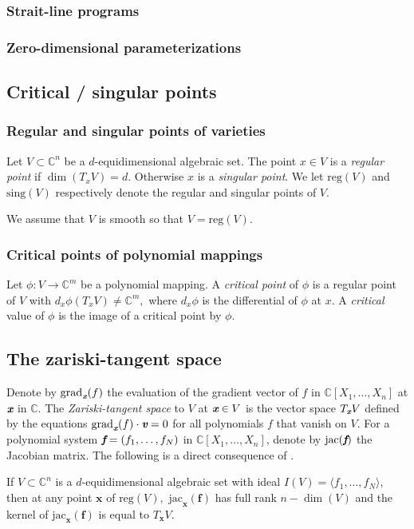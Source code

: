 \documentclass[sigconf]{acmart}
\def\xb{\textit{\textbf{x}}}
\def\C{\mathbb{C}}
\def\sing{ \textrm{sing}}
\def\jac{ \textrm{jac}}
\def\grad{\textrm{grad}}
\def\reg{\textrm{reg}}
\begin{document}
\subsubsection{Strait-line programs}
%
\subsubsection{Zero-dimensional parameterizations}
%
\subsection{Critical / singular points}
%
\subsubsection{Regular and singular points of varieties}
%
Let $V \subset \C^n$ be a $d$-equidimensional algebraic set. 
The point $x \in V$ is a \textit{regular point} if $\dim (T_xV) = d.$ Otherwise $x$ is a \textit{singular point}. We let $\reg(V)$ and $\sing(V)$ respectively denote the regular and singular points of $V$. 
\par 
We assume that $V$ is smooth so that $V=\reg(V).$
%
\subsubsection{Critical points of polynomial mappings}
%
Let $\phi : V \rightarrow \C^m$ be a polynomial mapping. A \textit{critical point} of $\phi$ is a regular point of $V$ with $d_x \phi(T_xV) \not = \C^m,$ where $d_x \phi$ is the differential of $\phi$ at $x.$ A \textit{critical} value of $\phi$ is the image of a critical point by $\phi$.
%
\subsection{The zariski-tangent space}
%
Denote by $\grad_{\xb}(f)$ the evaluation of the gradient vector of $f$ in $\C[X_1,\hdots,X_n]$ at $\textit{\textbf{x}}$ in $\C$.
The \textit{Zariski-tangent space} to $V$ at $\textit{\textbf{x}} \in V$ is the vector space $T_{\xb}V$ defined by the equations $\grad_{\xb}(f) \cdot \textit{\textbf{v}}=0$ for all polynomials $f$ that vanish on $V$. For a polynomial system $\textit{\textbf{f}}=(f_1,\hdots,f_N)$ in $\C[X_1,\hdots,X_n]$, denote by $\jac(\textit{\textbf{f}})$ the Jacobian matrix.
The following is a direct consequence of \cite[Corollary 16.20]{ECA}.
%
\begin{proposition}
If $V \subset \C^n$ is a $d$-equidimensional algebraic set with ideal $I(V)=\langle f_1,\hdots,f_N \rangle$, then at any point $\textbf{x}$ of $\reg(V),$ $\jac_\textbf{x}(\textbf{f})$ has full rank $n - \dim(V)$ and the kernel of $\jac_\textbf{x}(\textbf{f})$ is equal to $T_\textbf{x}V.$ 
\end{proposition}
%
\end{document}
